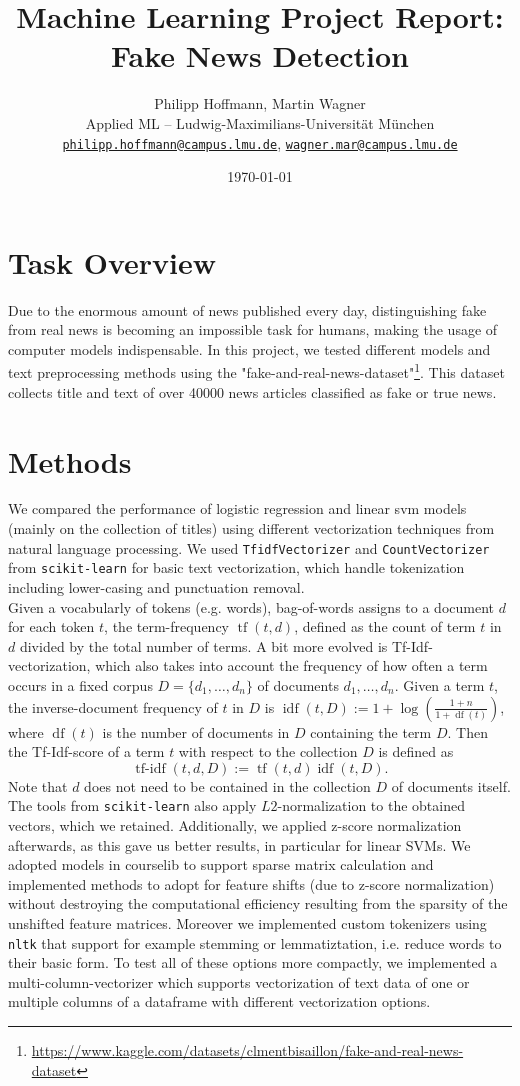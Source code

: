 \documentclass[10pt]{article}
\title{\textbf{Machine Learning Project Report: Fake News Detection}}
\author{Philipp Hoffmann, Martin Wagner \\
	Applied ML – Ludwig-Maximilians-Universität München \\
	\texttt{\href{mailto:philipp.hoffmann@campus.lmu.de}{philipp.hoffmann@campus.lmu.de}},
	\texttt{\href{mailto:wagner.mar@campus.lmu.de}{wagner.mar@campus.lmu.de}}}
\date{\today}
\begin{document}
	
	\maketitle
	
	\section{Task Overview}
	Due to the enormous amount of news published every day, distinguishing fake from real news is becoming an impossible task for humans, making the usage of computer models indispensable. In this project, we tested different models and text preprocessing methods using the "fake-and-real-news-dataset"\footnote{\url{https://www.kaggle.com/datasets/clmentbisaillon/fake-and-real-news-dataset}}. This dataset collects title and text of over 40000 news articles classified as fake or true news.
	
	\section{Methods}
	We compared the performance of logistic regression and linear svm models (mainly on the collection of titles) using different vectorization techniques from natural language processing. 
	We used \texttt{TfidfVectorizer} and \texttt{CountVectorizer} from \texttt{scikit-learn} for basic text vectorization, which handle tokenization including lower-casing and punctuation removal.\\
	
	Given a vocabularly of tokens (e.g. words), bag-of-words assigns to a document $d$ for each token $t$, the term-frequency $\operatorname{tf}(t,d)$, defined as the count of term $t$ in $d$ divided by the total number of terms. A bit more evolved is Tf-Idf-vectorization, which also takes into account the frequency of how often a term occurs in a fixed corpus $D=\{d_1, \dots, d_n\}$ of documents $d_1, \dots, d_n$. Given a term $t$, the inverse-document frequency of $t$ in $D$ is $\operatorname{idf}(t,D):=1+\log\left(\frac{1+n}{1+\operatorname{df}(t)}\right)$, where $\operatorname{df}(t)$ is the number of documents in $D$ containing the term $D$. Then the Tf-Idf-score of a term $t$ with respect to the collection $D$ is defined as \[\operatorname{tf-idf}(t,d,D):=\operatorname{tf}(t,d)\operatorname{idf}(t,D).\]
	Note that $d$ does not need to be contained in the collection $D$ of documents itself. The tools from \texttt{scikit-learn} also apply $L2$-normalization to the obtained vectors, which we retained. Additionally, we applied z-score normalization afterwards, as this gave us better results, in particular for linear SVMs. 
	We adopted models in courselib to support sparse matrix calculation and implemented methods to adopt for feature shifts (due to z-score normalization) without destroying the computational efficiency resulting from the sparsity of the unshifted feature matrices. Moreover we implemented custom tokenizers using \texttt{nltk} 
	that support for example stemming or lemmatiztation, i.e. reduce words to their basic form. To test all of these options more compactly, we implemented a multi-column-vectorizer which supports vectorization of text data of one or multiple columns of a dataframe with different vectorization options.
	
\end{document}
